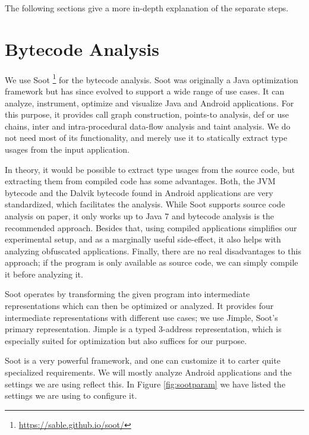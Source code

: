 The following sections give a more in-depth explanation of the separate steps.

\section{Bytecode Analysis}\label{sec:bytecode}

We use Soot \footnote{\url{https://sable.github.io/soot/}} for the bytecode analysis.
Soot was originally a Java optimization framework but has since evolved to support a wide range of use cases.
It can analyze, instrument, optimize and visualize Java and Android applications.
For this purpose, it provides call graph construction, points-to analysis, def or use chains, inter and intra-procedural data-flow analysis and taint analysis.
We do not need most of its functionality, and merely use it to statically extract type usages from the input application.

In theory, it would be possible to extract type usages from the source code, but extracting them from compiled code has some advantages.
Both, the JVM bytecode and the Dalvik bytecode found in Android applications are very standardized, which facilitates the analysis.
While Soot supports source code analysis on paper, it only works up to Java 7 and bytecode analysis is the recommended approach.
Besides that, using compiled applications simplifies our experimental setup, and as a marginally useful side-effect, it also helps with analyzing obfuscated applications.
Finally, there are no real disadvantages to this approach; if the program is only available as source code, we can simply compile it before analyzing it.

Soot operates by transforming the given program into intermediate representations which can then be optimized or analyzed.
It provides four intermediate representations with different use cases; we use Jimple, Soot's primary representation.
Jimple is a typed 3-address representation, which is especially suited for optimization but also suffices for our purpose.

Soot is a very powerful framework, and one can customize it to carter quite specialized requirements.
We will mostly analyze Android applications and the settings we are using reflect this.
In Figure \ref{fig:sootparam} we have listed the settings we are using to configure it.

